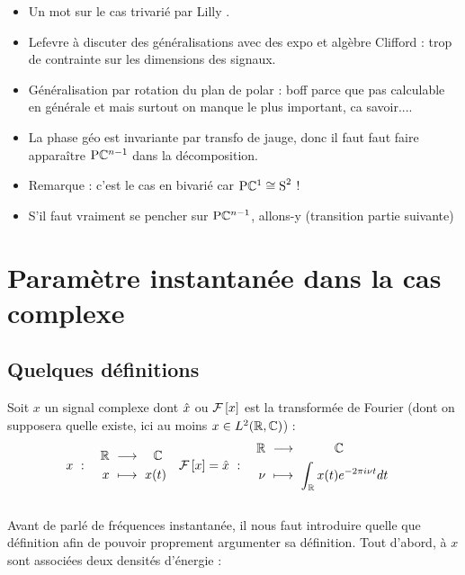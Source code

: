 \begin{enumerate}[label=\arabic* --- ]
\begin{itemize}
		\item Un mot sur le cas trivarié par Lilly \cite{lilly_modulated_2011}.
		
		\item Lefevre à discuter des généralisations \cite[sec. I.3]{lefevre_polarization_2021} avec des expo et algèbre Clifford : trop de contrainte sur les dimensions des signaux.
		
		\item Généralisation par rotation du plan de polar : boff parce que pas calculable en générale et mais surtout on manque le plus important, ca savoir.... 
		
		\item La phase géo est invariante par transfo de jauge, donc il faut faut faire apparaître $\text{\normalfont P}\mathbb{C}^{n-1}$ dans la décomposition.
		
		\item Remarque : c'est le cas en bivarié car $\text{\normalfont P}\mathbb{C}^{1}\cong \text{\normalfont S}^{2}$ !
		
		\item S'il faut vraiment se pencher sur $\text{\normalfont P}\mathbb{C}^{n-1}$, allons-y (transition partie suivante)
				
	\end{itemize}
\end{enumerate}




\section{Paramètre instantanée dans la cas complexe}\label{sec:temp-freq}


\subsection{Quelques définitions}\label{sec:preli_temp-freq}

Soit $x$ un signal complexe dont $\hat{x}$ ou $\mathcal{F}\left[x\right]$ est la transformée de Fourier (dont on supposera quelle existe, ici au moins $x\in L^2(\mathbb{R}, \mathbb{C})$) :
\begin{align*}
	x\ &:\quad \begin{aligned}\R\ &\lr\quad \C \\ x\ &\longmapsto\ x(t)
	\end{aligned}  &  \Fou{x}=\fou{x}\ &:\quad \begin{aligned}\R\ &\lr\qquad\quad \C \\ \nu\ &\longmapsto\ \int_\R x(t)e^{-2\pi i \nu t}dt
	\end{aligned}
\end{align*}
\\
Avant de parlé de fréquences instantanée, il nous faut introduire quelle que définition afin de pouvoir proprement argumenter sa définition.
Tout d'abord, à $x$ sont associées deux densités d'énergie :

